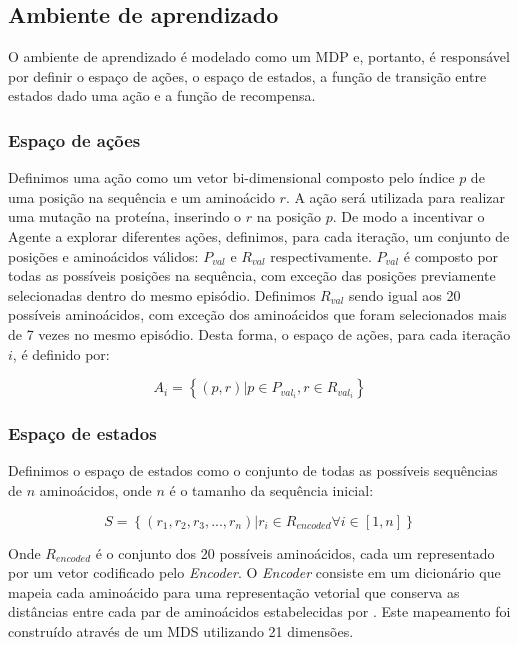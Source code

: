 \subsection{Ambiente de aprendizado}
O ambiente de aprendizado é modelado como um MDP e, portanto, é responsável por definir o espaço de ações, o espaço de estados, a função de transição entre estados dado uma ação e a função de recompensa.  

\subsubsection{Espaço de ações}

Definimos uma ação como um vetor bi-dimensional composto pelo índice $p$ de uma posição na sequência e um aminoácido $r$. 
A ação será utilizada para realizar uma mutação na proteína, inserindo o $r$ na posição $p$. 
De modo a incentivar o Agente a explorar diferentes ações, 
definimos, para cada iteração, um conjunto de posições e aminoácidos válidos: $P_{val}$ e $R_{val}$ respectivamente. 
$P_{val}$ é composto por todas as possíveis posições na sequência, com exceção das posições previamente selecionadas dentro do mesmo episódio. 
Definimos $R_{val}$ sendo igual aos 20 possíveis aminoácidos, com exceção dos aminoácidos que foram selecionados mais de 7 vezes no mesmo episódio. 
Desta forma, o espaço de ações, para cada iteração $i$, é definido por:

\begin{equation}
A_{i} = \left\{(p, r) | p \in P_{val_{i}} , r \in R_{val_{i}} \right\}
\end{equation}
  

\subsubsection{Espaço de estados}
Definimos o espaço de estados como o conjunto de todas as possíveis sequências de $n$ aminoácidos, onde $n$ é o tamanho da sequência inicial:

\begin{equation}
S = \left\{(r_{1}, r_{2}, r_{3}, ..., r_{n}) | r_{i} \in R_{encoded} \forall i \in [1,n] \right\}
\end{equation}

Onde $R_{encoded}$ é o conjunto dos 20 possíveis aminoácidos, 
cada um representado por um vetor codificado pelo \textit{Encoder}. 
O \textit{Encoder} consiste em um dicionário que mapeia cada aminoácido para 
uma representação vetorial que conserva as distâncias entre cada par de aminoácidos estabelecidas por \cite{aminodist}.
Este mapeamento foi construído através de um MDS utilizando 21 dimensões. 

